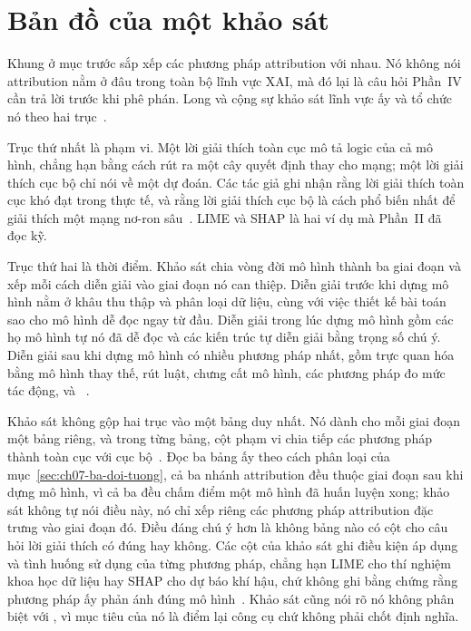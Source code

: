 \section{Bản đồ của một khảo sát}
\label{sec:ch07-ban-do}

%
%
Khung ở mục trước sắp xếp các phương pháp attribution với nhau. Nó không nói
attribution nằm ở đâu trong toàn bộ lĩnh vực XAI, mà đó lại là câu hỏi Phần~IV
cần trả lời trước khi phê phán. Long và cộng sự khảo sát lĩnh vực ấy và tổ chức
nó theo hai trục~\autocite{p20trends}.

Trục thứ nhất là phạm vi. Một lời giải thích toàn cục mô tả logic của cả mô
hình, chẳng hạn bằng cách rút ra một cây quyết định thay cho mạng; một lời giải
thích cục bộ chỉ nói về một dự đoán. Các tác giả ghi nhận rằng lời giải thích
toàn cục khó đạt trong thực tế, và rằng lời giải thích cục bộ là cách phổ biến
nhất để giải thích một mạng nơ-ron sâu~\autocite{p20trends}. LIME và SHAP là hai
ví dụ mà Phần~II đã đọc kỹ.

Trục thứ hai là thời điểm. Khảo sát chia vòng đời mô hình thành ba giai đoạn và
xếp mỗi cách diễn giải vào giai đoạn nó can thiệp. Diễn giải trước khi dựng mô
hình nằm ở khâu thu thập và phân loại dữ liệu, cùng với việc thiết kế bài toán
sao cho mô hình dễ đọc ngay từ đầu. Diễn giải trong lúc dựng mô hình gồm các họ
mô hình tự nó đã dễ đọc và các kiến trúc tự diễn giải bằng trọng số chú ý. Diễn
giải sau khi dựng mô hình có nhiều phương pháp nhất, gồm trực quan hóa bằng mô
hình thay thế, rút luật, chưng cất mô hình, các phương pháp đo mức tác động, và
~\autocite{p20trends}.

Khảo sát không gộp hai trục vào một bảng duy nhất. Nó dành cho mỗi giai đoạn một
bảng riêng, và trong từng bảng, cột phạm vi chia tiếp các phương pháp thành toàn
cục với cục bộ~\autocite{p20trends}. Đọc ba bảng ấy theo cách phân loại của
mục~\ref{sec:ch07-ba-doi-tuong}, cả ba nhánh attribution đều thuộc giai đoạn sau khi dựng mô hình, vì cả
ba đều chấm điểm một mô hình đã huấn luyện xong; khảo sát không tự nói điều này,
nó chỉ xếp riêng các phương pháp attribution đặc trưng vào giai đoạn đó. Điều
đáng chú ý hơn là không bảng nào có cột cho câu hỏi lời giải thích có đúng hay
không. Các cột của khảo sát ghi điều kiện áp dụng và tình huống sử dụng của từng
phương pháp, chẳng hạn LIME cho thí nghiệm khoa học dữ liệu hay SHAP cho dự báo
khí hậu, chứ không ghi bằng chứng rằng phương pháp ấy phản ánh đúng mô
hình~\autocite{p20trends}. Khảo sát cũng nói rõ nó không phân biệt
 với
, vì mục tiêu của nó là điểm lại công cụ
chứ không phải chốt định nghĩa.

